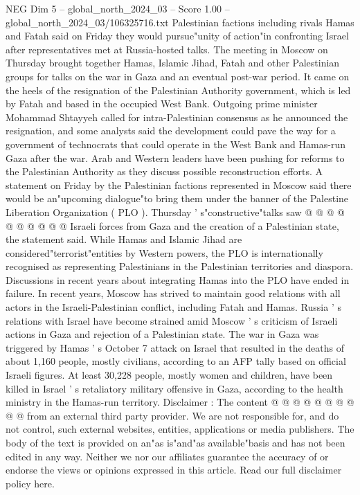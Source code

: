 \begin{textsample}{NEG Dim 5 – global\_north\_2024\_03 – Score 1.00 – global\_north\_2024\_03/106325716.txt}  \label{ex:f5_neg_090}
Palestinian factions including rivals Hamas and Fatah said on Friday they would pursue"unity of action"in confronting Israel after representatives met at Russia-hosted talks.
The meeting in Moscow on Thursday brought together Hamas, Islamic Jihad, Fatah and other Palestinian groups for talks on the war in Gaza and an eventual post-war period.
It came on the heels of the resignation of the Palestinian Authority government, which is led by Fatah and based in the occupied West Bank.
Outgoing prime minister Mohammad Shtayyeh called for intra-Palestinian consensus as he announced the resignation, and some analysts said the development could pave the way for a government of technocrats that could operate in the West Bank and Hamas-run Gaza after the war.
Arab and Western leaders have been pushing for reforms to the Palestinian Authority as they discuss possible reconstruction efforts.
A statement on Friday by the Palestinian factions represented in Moscow said there would be an"upcoming dialogue"to bring them under the banner of the Palestine Liberation Organization ( PLO ).
Thursday ' s"constructive"talks saw @ @ @ @ @ @ @ @ @ @ Israeli forces from Gaza and the creation of a Palestinian state, the statement said.
While Hamas and Islamic Jihad are considered"terrorist"entities by Western powers, the PLO is internationally recognised as representing Palestinians in the Palestinian territories and diaspora.
Discussions in recent years about integrating Hamas into the PLO have ended in failure.
In recent years, Moscow has strived to maintain good relations with all actors in the Israeli-Palestinian conflict, including Fatah and Hamas.
Russia ' s relations with Israel have become strained amid Moscow ' s criticism of Israeli actions in Gaza and rejection of a Palestinian state.
The war in Gaza was triggered by Hamas ' s October 7 attack on Israel that resulted in the deaths of about 1,160 people, mostly civilians, according to an AFP tally based on official Israeli figures.
At least 30,228 people, mostly women and children, have been killed in Israel ' s retaliatory military offensive in Gaza, according to the health ministry in the Hamas-run territory.
Disclaimer : The content @ @ @ @ @ @ @ @ @ @ from an external third party provider.
We are not responsible for, and do not control, such external websites, entities, applications or media publishers.
The body of the text is provided on an"as is"and"as available"basis and has not been edited in any way.
Neither we nor our affiliates guarantee the accuracy of or endorse the views or opinions expressed in this article.
Read our full disclaimer policy here.

\end{textsample}
